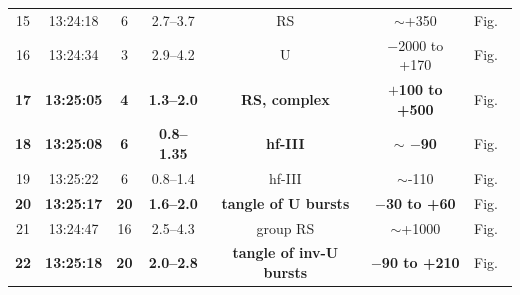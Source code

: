 \documentclass[11pt]{article}
\begin{document}
\begin{table}[htbp]
{\begin{tabular}{ccccccc}
15 & 13:24:18 & 6       & 2.7--3.7 & RS &  $\sim$+350 & Fig.~\\
16 & 13:24:34 & 3       & 2.9--4.2 & U  & $-$2000 to +170   & Fig.~ \\
\textbf{17} & \textbf{13:25:05} & \textbf{4} & \textbf{1.3--2.0} & \textbf{RS, complex}  & \textbf{$+$100 to +500} & Fig.~\\
\textbf{18} & \textbf{13:25:08} & \textbf{6} & \textbf{0.8--1.35} & \textbf{hf-III} & \textbf{$\sim$ $-$90} & Fig.~\\
19 & 13:25:22 & 6       & 0.8--1.4 &  hf-III      & $\sim$-110& Fig.~\\
\textbf{20} & \textbf{13:25:17} & \textbf{20} & \textbf{1.6--2.0} & \textbf{tangle of U bursts} & \textbf{$-$30 to +60} & Fig.~\\
21 & 13:24:47 & 16      & 2.5--4.3 & group RS & $\sim$+1000 & Fig.~\\
\textbf{22} & \textbf{13:25:18} & \textbf{20} & \textbf{2.0--2.8} & \textbf{tangle of inv-U bursts} & \textbf{$-$90 to +210} & Fig.~\\
\hline
\end{tabular}
}
\end{table}
\end{document}
